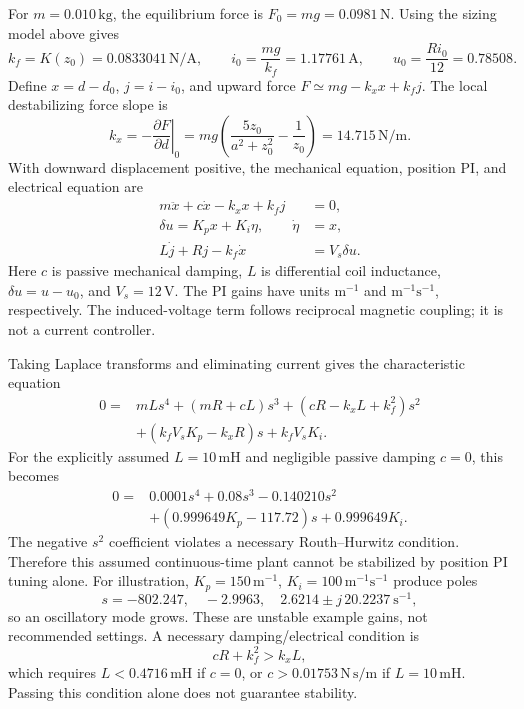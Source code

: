 \documentclass[11pt,letterpaper]{article}
\begin{document}
For \(m=0.010\,\mathrm{kg}\), the equilibrium force is
\(F_0=mg=0.0981\,\mathrm N\). Using the sizing model above gives
\begin{equation}
 k_f=K(z_0)=0.0833041\,\mathrm{N/A},\qquad
 i_0=\frac{mg}{k_f}=1.17761\,\mathrm A,\qquad u_0=\frac{Ri_0}{12}=0.78508.
\end{equation}
Define \(x=d-d_0\), \(j=i-i_0\), and upward force
\(F\simeq mg-k_xx+k_fj\). The local destabilizing force slope is
\begin{equation}
 k_x=-\left.\frac{\partial F}{\partial d}\right|_0
 =mg\left(\frac{5z_0}{a^2+z_0^2}-\frac1{z_0}\right)
 =14.715\,\mathrm{N/m}.
\end{equation}
With downward displacement positive, the mechanical equation, position PI,
and electrical equation are
\begin{align}
 m\ddot x+c\dot x-k_xx+k_fj&=0,\\
 \delta u=K_px+K_i\eta,\qquad\dot\eta&=x,\\
 L\dot j+Rj-k_f\dot x&=V_s\delta u.
\end{align}
Here \(c\) is passive mechanical damping, \(L\) is differential coil
inductance, \(\delta u=u-u_0\), and \(V_s=12\,\mathrm V\).
The PI gains have units \(\mathrm{m^{-1}}\) and
\(\mathrm{m^{-1}s^{-1}}\), respectively. The induced-voltage term follows
reciprocal magnetic coupling; it is not a current controller.

Taking Laplace transforms and eliminating current gives the characteristic
equation
\begin{equation}
\boxed{\begin{aligned}
0={}&mLs^4+(mR+cL)s^3+(cR-k_xL+k_f^2)s^2\\
   &+(k_fV_sK_p-k_xR)s+k_fV_sK_i.
\end{aligned}}
\end{equation}
For the explicitly assumed \(L=10\,\mathrm{mH}\) and negligible passive
damping \(c=0\), this becomes
\begin{equation}
\boxed{\begin{aligned}
0={}&0.0001s^4+0.08s^3-0.140210s^2\\
   &+(0.999649K_p-117.72)s+0.999649K_i.
\end{aligned}}
\end{equation}
The negative \(s^2\) coefficient violates a necessary Routh--Hurwitz
condition. Therefore this assumed continuous-time plant cannot be
stabilized by position PI tuning alone. For illustration,
\(K_p=150\,\mathrm{m^{-1}}\), \(K_i=100\,\mathrm{m^{-1}s^{-1}}\)
produce poles
\begin{equation}
 s=-802.247,\quad -2.9963,\quad 2.6214\pm j\,20.2237\ \mathrm{s^{-1}},
\end{equation}
so an oscillatory mode grows. These are unstable example gains, not
recommended settings. A necessary damping/electrical condition is
\begin{equation}
 cR+k_f^2>k_xL,
\end{equation}
which requires \(L<0.4716\,\mathrm{mH}\) if \(c=0\), or
\(c>0.01753\,\mathrm{N\,s/m}\) if \(L=10\,\mathrm{mH}\).
Passing this condition alone does not guarantee stability.
\end{document}
